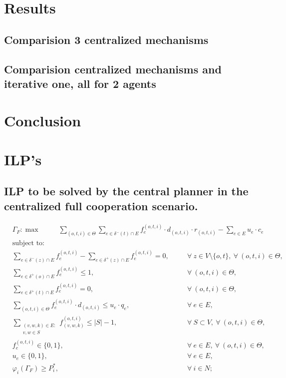 \documentclass[review]{elsarticle}
\begin{document}
\section{Results}

\subsection{Comparision 3 centralized mechanisms}

\subsection{Comparision centralized mechanisms and iterative one, all for 2 agents}

\section{Conclusion}




\appendix
\section{ILP's}

\subsection{ILP to be solved by the central planner in the centralized full cooperation scenario.}

    \begin{align}
        &  \Gamma_F: \max  & \hspace{22pt} \sum_{(o,t,i)\in \Theta} \sum_{e \in \delta^-(t)\cap E}  f_e^{(o,t,i)} \cdot d_{(o,t,i)} \cdot r_{(o,t,i)} - \sum_{e\in E} u_{e}\cdot c_{e} \hspace{40pt} && 
    \end{align}
    \begin{align}
        & \text{subject to:}       && \nonumber \\
        & \sum_{e \in \delta^-(z)\cap E} f_e^{(o,t,i)} -\sum_{e \in \delta^+(z)\cap E} f_{e}^{(o,t,i)} = 0,\quad && \forall\ z\in V\setminus\{o,t\},\ \forall\ (o,t,i)\in\Theta, \\
& \sum_{e \in \delta^+(o)\cap E} f_e^{(o,t,i)} \leq 1, && \forall\ (o,t,i)\in \Theta, \\
 & \sum_{e \in \delta^+(t)\cap E} f_e^{(o,t,i)} = 0,  && \forall\ (o,t,i)\in \Theta,  \\
& \sum_{(o,t,i) \in \Theta} f_e^{(o,t,i)}\cdot d_{(o,t,i)}  \leq u_e\cdot q_e, && \forall\ e \in E,   \\
 & \sum_{\substack{(v,w,k) \in E\colon \\ v,w \in S}} f_{(v,w,k)}^{(o,t,i)} \leq |S| -1, && \forall\ S \subset V,\ \forall\ (o,t,i) \in \Theta,\\
& f_e^{(o,t,i)} \in \{0,1\},  && \forall\ e \in E,\ \forall\ (o,t,i) \in \Theta,  \\
&  u_e  \in \{0,1\},  && \forall\ e \in E, \\
& \varphi_i(\Gamma_F) \geq P_i^*,  && \forall\ i\in N; 
    \end{align}
\end{document}
